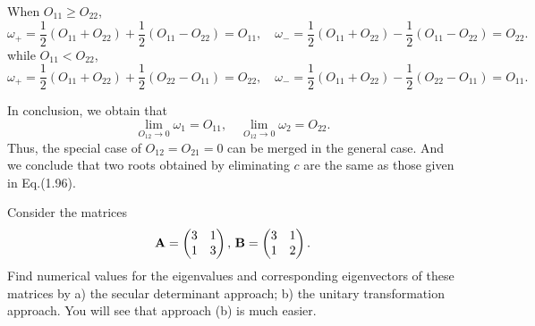 \documentclass[a4paper]{book}
\newcounter{exercise}[chapter]
\newcounter{solution}[chapter]
\newcommand{\A}{{\bf A}}
\newcommand{\B}{{\bf B}}
\begin{document}
\begin{solution}
	When $O_{11} \ge O_{22}$,
	\[
		\omega_+ = \frac{1}{2} \left( O_{11} + O_{22} \right) + \frac{1}{2} \left( O_{11} - O_{22} \right) = O_{11} , \quad \omega_- = \frac{1}{2} \left( O_{11} + O_{22} \right) - \frac{1}{2} \left( O_{11} - O_{22} \right) = O_{22} .
	\]	
	while $O_{11} < O_{22}$,
	\[
		\omega_+ = \frac{1}{2} \left( O_{11} + O_{22} \right) + \frac{1}{2} \left( O_{22} - O_{11} \right) = O_{22} , \quad \omega_- = \frac{1}{2} \left( O_{11} + O_{22} \right) - \frac{1}{2} \left( O_{22} - O_{11} \right) = O_{11} .
	\]	
	
	In conclusion, we obtain that
	\[
		\lim_{O_{12} \rightarrow 0} \omega_1 = O_{11} , \quad \lim_{O_{12} \rightarrow 0} \omega_2 = O_{22} .
	\]
	Thus, the special case of $O_{12} = O_{21} = 0$ can be merged in the general case. And we conclude that two roots obtained by eliminating $c$ are the same as those given in Eq.(1.96).
	
	\end{solution}
	
	\begin{exercise}
	Consider the matrices
	\begin{equation*}
		\A = \begin{pmatrix} 3 & 1 \\ 1 & 3 \end{pmatrix}, \,  \B = \begin{pmatrix} 3 & 1 \\ 1 & 2 \end{pmatrix}.
	\end{equation*}
	Find numerical values for the eigenvalues and corresponding eigenvectors of these matrices by a) the secular determinant approach; b) the unitary transformation approach. You will see that approach (b) is much easier.
	\end{exercise}
	
\end{document}

